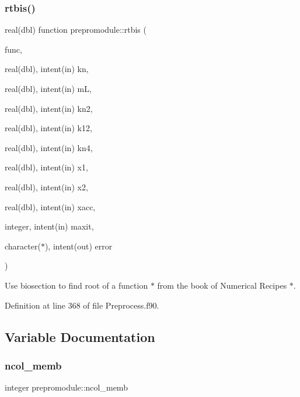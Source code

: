 \subsubsection{\texorpdfstring{rtbis()}{rtbis()}}
{\footnotesize\ttfamily real(dbl) function prepromodule\+::rtbis (\begin{DoxyParamCaption}\item[{}]{func,  }\item[{real(dbl), intent(in)}]{kn,  }\item[{real(dbl), intent(in)}]{mL,  }\item[{real(dbl), intent(in)}]{kn2,  }\item[{real(dbl), intent(in)}]{k12,  }\item[{real(dbl), intent(in)}]{kn4,  }\item[{real(dbl), intent(in)}]{x1,  }\item[{real(dbl), intent(in)}]{x2,  }\item[{real(dbl), intent(in)}]{xacc,  }\item[{integer, intent(in)}]{maxit,  }\item[{character($\ast$), intent(out)}]{error }\end{DoxyParamCaption})\hspace{0.3cm}{\ttfamily [private]}}



Use biosection to find root of a function $\ast$ from the book of Numerical Recipes $\ast$. 



Definition at line 368 of file Preprocess.\+f90.



\subsection{Variable Documentation}
\mbox{\label{namespaceprepromodule_a41d66ef3ffc050f01bc1763c62c6f3e1}} 
\subsubsection{\texorpdfstring{ncol\+\_\+memb}{ncol\_memb}}
{\footnotesize\ttfamily integer prepromodule\+::ncol\+\_\+memb\hspace{0.3cm}{\ttfamily [private]}}



